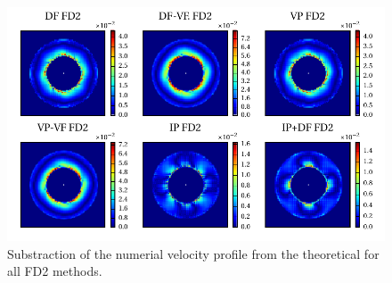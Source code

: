 \begin{figure}[!bp]
  \includegraphics{gfx/immersed_boundary/tcflow/long/vz_profiles_o2.pdf}
  \caption{\label{tcflow:results_vprofiles_o2}
    Substraction of the numerial velocity profile from the theoretical
        for all FD2 methods.}
\end{figure}

